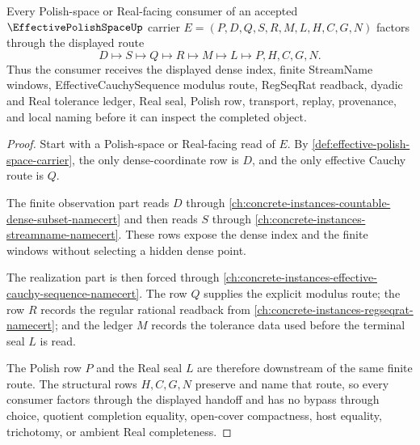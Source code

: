 \begin{theorem}\label{thm:effective-polish-space-realizer-handoff}
Every Polish-space or Real-facing consumer of an accepted $\EffectivePolishSpaceUp$ carrier $E=(P,D,Q,S,R,M,L,H,C,G,N)$ factors through the displayed route
$$
D \longmapsto S \longmapsto Q \longmapsto R \longmapsto M \longmapsto L \longmapsto P,H,C,G,N .
$$
Thus the consumer receives the displayed dense index, finite StreamName windows, EffectiveCauchySequence modulus route, RegSeqRat readback, dyadic and Real tolerance ledger, Real seal, Polish row, transport, replay, provenance, and local naming before it can inspect the completed object.
\end{theorem}
\begin{proof}
Start with a Polish-space or Real-facing read of $E$. By \autoref{def:effective-polish-space-carrier}, the only dense-coordinate row is $D$, and the only effective Cauchy route is $Q$.

The finite observation part reads $D$ through \autoref{ch:concrete-instances-countable-dense-subset-namecert} and then reads $S$ through \autoref{ch:concrete-instances-streamname-namecert}. These rows expose the dense index and the finite windows without selecting a hidden dense point.

The realization part is then forced through \autoref{ch:concrete-instances-effective-cauchy-sequence-namecert}. The row $Q$ supplies the explicit modulus route; the row $R$ records the regular rational readback from \autoref{ch:concrete-instances-regseqrat-namecert}; and the ledger $M$ records the tolerance data used before the terminal seal $L$ is read.

The Polish row $P$ and the Real seal $L$ are therefore downstream of the same finite route. The structural rows $H,C,G,N$ preserve and name that route, so every consumer factors through the displayed handoff and has no bypass through choice, quotient completion equality, open-cover compactness, host equality, trichotomy, or ambient Real completeness.
\end{proof}

